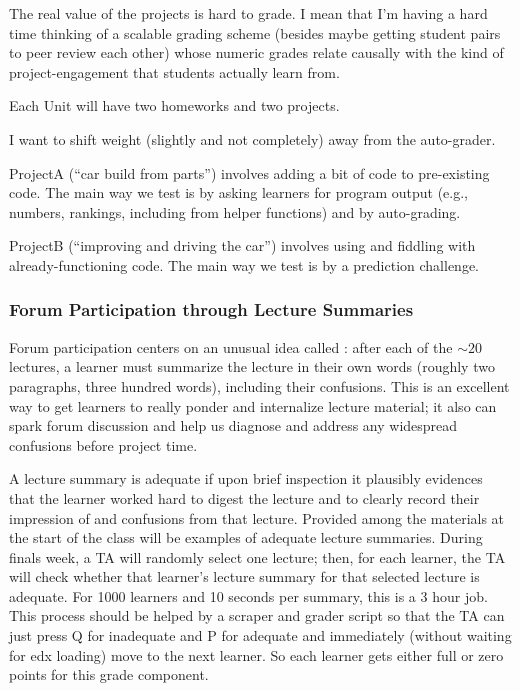 \documentclass[12pt]{article}
\begin{document}
        The real value of the projects is hard to grade.  I mean that I'm
        having a hard time thinking of a scalable grading scheme (besides maybe
        getting student pairs to peer review each other) whose numeric grades
        relate causally with the kind of project-engagement that students
        actually learn from.

        Each Unit will have two homeworks and two projects.

        I want to shift weight (slightly and not completely) away from
        the auto-grader.

        ProjectA (``car build from parts'') involves adding a bit of code to
        pre-existing code.  The main way we test is by asking learners for
        program output (e.g., numbers, rankings, including from helper
        functions) and by auto-grading.

        ProjectB (``improving and driving the car'') involves using and
        fiddling with already-functioning code.  The main way we test is by a
        prediction challenge.

      \subsubsection*{Forum Participation through Lecture Summaries}
        Forum participation centers on an unusual idea called
        : after each of the $\sim 20$ lectures, a
        learner must summarize the lecture in their own words (roughly two
        paragraphs, three hundred words), including their confusions.
        This is an excellent way to get learners to really ponder and internalize
        lecture material; it also can spark forum discussion and help us diagnose
        and address any widespread confusions before project time.

        A lecture summary is adequate if upon brief inspection it plausibly
        evidences that the learner worked hard to digest the lecture and to
        clearly record their impression of and confusions from that lecture.
        Provided among the materials at the start of the class will be examples
        of adequate lecture summaries.  During finals week, a TA will randomly
        select one lecture; then, for each learner, the TA will check whether
        that learner's lecture summary for that selected lecture is adequate.
        For 1000 learners and 10 seconds per summary, this is a 3 hour job.
        This process should be helped by a scraper and grader script so that
        the TA can just press Q for inadequate and P for adequate and
        immediately (without waiting for edx loading) move to the next learner.
        So each learner gets either full or zero points for this grade
        component.
\end{document}

